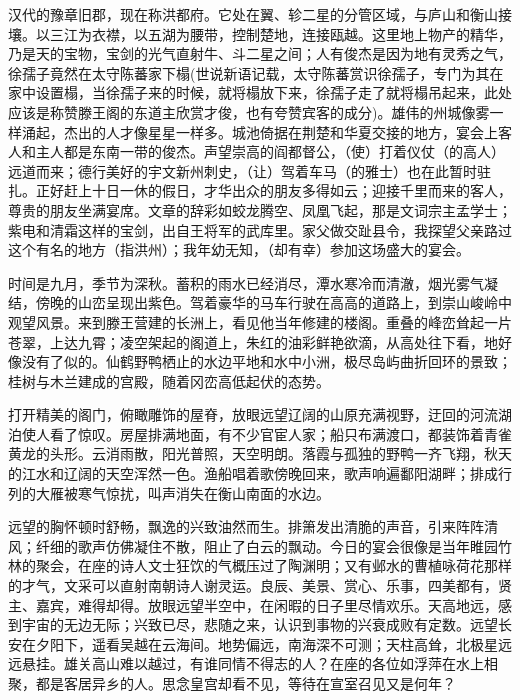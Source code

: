 \documentclass[12pt,UTF-8,openany,a4]{ctexbook}
\begin{document}
\begin{large}\yiwen
    
    汉代的豫章旧郡，现在称洪都府。它处在翼、轸二星的分管区域，与庐山和衡山接壤。以三江为衣襟，以五湖为腰带，控制楚地，连接瓯越。这里地上物产的精华，乃是天的宝物，宝剑的光气直射牛、斗二星之间；人有俊杰是因为地有灵秀之气，徐孺子竟然在太守陈蕃家下榻(世说新语记载，太守陈蕃赏识徐孺子，专门为其在家中设置榻，当徐孺子来的时候，就将榻放下来，徐孺子走了就将榻吊起来，此处应该是称赞滕王阁的东道主欣赏才俊，也有夸赞宾客的成分)。雄伟的州城像雾一样涌起，杰出的人才像星星一样多。城池倚据在荆楚和华夏交接的地方，宴会上客人和主人都是东南一带的俊杰。声望崇高的阎都督公，（使）打着仪仗（的高人）远道而来；德行美好的宇文新州刺史，（让）驾着车马（的雅士）也在此暂时驻扎。正好赶上十日一休的假日，才华出众的朋友多得如云；迎接千里而来的客人，尊贵的朋友坐满宴席。文章的辞彩如蛟龙腾空、凤凰飞起，那是文词宗主孟学士；紫电和清霜这样的宝剑，出自王将军的武库里。家父做交趾县令，我探望父亲路过这个有名的地方（指洪州）；我年幼无知，（却有幸）参加这场盛大的宴会。
    
    时间是九月，季节为深秋。蓄积的雨水已经消尽，潭水寒冷而清澈，烟光雾气凝结，傍晚的山峦呈现出紫色。驾着豪华的马车行驶在高高的道路上，到崇山峻岭中观望风景。来到滕王营建的长洲上，看见他当年修建的楼阁。重叠的峰峦耸起一片苍翠，上达九霄；凌空架起的阁道上，朱红的油彩鲜艳欲滴，从高处往下看，地好像没有了似的。仙鹤野鸭栖止的水边平地和水中小洲，极尽岛屿曲折回环的景致；桂树与木兰建成的宫殿，随着冈峦高低起伏的态势。
    
    打开精美的阁门，俯瞰雕饰的屋脊，放眼远望辽阔的山原充满视野，迂回的河流湖泊使人看了惊叹。房屋排满地面，有不少官宦人家；船只布满渡口，都装饰着青雀黄龙的头形。云消雨散，阳光普照，天空明朗。落霞与孤独的野鸭一齐飞翔，秋天的江水和辽阔的天空浑然一色。渔船唱着歌傍晚回来，歌声响遍鄱阳湖畔；排成行列的大雁被寒气惊扰，叫声消失在衡山南面的水边。
    
    远望的胸怀顿时舒畅，飘逸的兴致油然而生。排箫发出清脆的声音，引来阵阵清风；纤细的歌声仿佛凝住不散，阻止了白云的飘动。今日的宴会很像是当年睢园竹林的聚会，在座的诗人文士狂饮的气概压过了陶渊明；又有邺水的曹植咏荷花那样的才气，文采可以直射南朝诗人谢灵运。良辰、美景、赏心、乐事，四美都有，贤主、嘉宾，难得却得。放眼远望半空中，在闲暇的日子里尽情欢乐。天高地远，感到宇宙的无边无际；兴致已尽，悲随之来，认识到事物的兴衰成败有定数。远望长安在夕阳下，遥看吴越在云海间。地势偏远，南海深不可测；天柱高耸，北极星远远悬挂。雄关高山难以越过，有谁同情不得志的人？在座的各位如浮萍在水上相聚，都是客居异乡的人。思念皇宫却看不见，等待在宣室召见又是何年？
    

\end{large}
\end{document}
